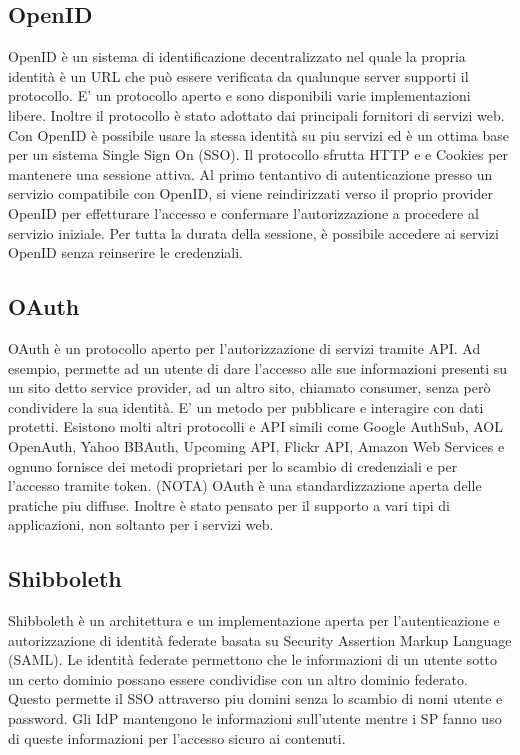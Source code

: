 \subsection{OpenID}
OpenID è un sistema di identificazione decentralizzato nel quale la
propria identità è un URL che può essere verificata da qualunque
server supporti il protocollo. E' un protocollo aperto e sono
disponibili varie implementazioni libere. Inoltre il protocollo è
stato adottato dai principali fornitori di servizi web. Con OpenID è
possibile usare la stessa identità su piu servizi ed è un ottima base
per un sistema Single Sign On (SSO). Il protocollo sfrutta HTTP e e
Cookies per mantenere una sessione attiva. Al primo tentantivo di
autenticazione presso un servizio compatibile con OpenID, si viene
reindirizzati verso il proprio provider OpenID per effetturare
l'accesso e confermare l'autorizzazione a procedere al servizio
iniziale. Per tutta la durata della sessione, è possibile accedere ai
servizi OpenID senza reinserire le credenziali.

\subsection{OAuth}
OAuth è un protocollo aperto per l'autorizzazione di servizi tramite
API. Ad esempio, permette ad un utente di dare l'accesso alle sue
informazioni presenti su un sito detto service provider, ad un altro
sito, chiamato consumer, senza però condividere la sua identità. E' un
metodo per pubblicare e interagire con dati protetti. Esistono molti
altri protocolli e API simili come Google AuthSub, AOL OpenAuth, Yahoo
BBAuth, Upcoming API, Flickr API, Amazon Web Services e ognuno
fornisce dei metodi proprietari per lo scambio di credenziali e per
l'accesso tramite token. (NOTA) OAuth è una standardizzazione aperta
delle pratiche piu diffuse. Inoltre è stato pensato per il supporto a
vari tipi di applicazioni, non soltanto per i servizi web.


\subsection{Shibboleth}
Shibboleth è un architettura e un implementazione aperta per
l'autenticazione e autorizzazione di identità federate basata su
Security Assertion Markup Language (SAML). Le identità federate
permettono che le informazioni di un utente sotto un certo dominio
possano essere condividise con un altro dominio federato. Questo
permette il SSO attraverso piu domini senza lo scambio di nomi utente
e password. Gli IdP mantengono le informazioni sull'utente mentre i SP
fanno uso di queste informazioni per l'accesso sicuro ai contenuti.

